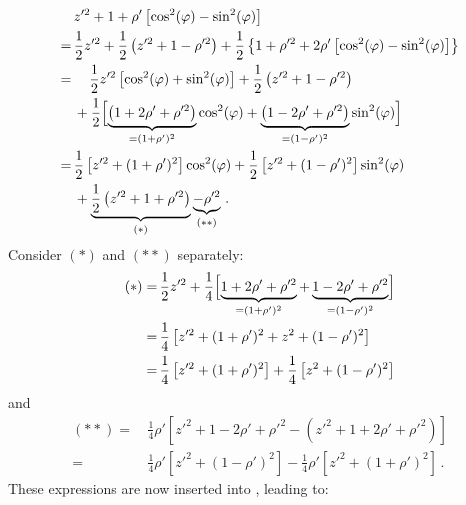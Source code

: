 \begin{align}
 ~&\, z'^2 + 1 + \rho' \left[ \cos^2(\varphi) - \sin^2(\varphi) \right] \nonumber \\
 =&\, \frac{1}{2} z'^2 + \frac{1}{2} \left( z'^2 + 1 - \rho'^2 \right) + \frac{1}{2} \left\{ 1 + \rho'^2 + 2 \rho' \left[ \cos^2(\varphi) - \sin^2(\varphi) \right] \right\} \nonumber \\
 =&\, \phantom{+}~
        \frac{1}{2} z'^2 \left[ \cos^2(\varphi) + \sin^2(\varphi) \right]
      + \frac{1}{2} \left( z'^2 + 1 - \rho'^2 \right) \nonumber \\
 ~&\, + \frac{1}{2} \Bigl[   \underbrace{\left( 1 + 2 \rho' + \rho'^2 \right)}_{=(1+\rho')^2} \cos^2(\varphi)
                           + \underbrace{\left( 1 - 2 \rho' + \rho'^2 \right)}_{=(1-\rho')^2} \sin^2(\varphi) \Bigr] \nonumber \\
 =&\,   \frac{1}{2} \left[ z'^2 + (1 + \rho')^2 \right] \cos^2(\varphi) + \frac{1}{2} \left[ z'^2 + (1 - \rho')^2 \right] \sin^2(\varphi) \nonumber \\
 ~&\, + \underbrace{\frac{1}{2} \left( z'^2 + 1 + \rho'^2 \right)}_{(*)} \underbrace{- \rho'^2}_{(**)} \label{eqn:bZCore} \, .
\end{align}
Consider $(*)$ and $(**)$ separately:
\begin{align}
 (*)
 =&\, \frac{1}{2} z'^2 + \frac{1}{4} \Bigl[ \underbrace{1 + 2 \rho' + \rho'^2}_{=(1+\rho')^2} + \underbrace{1 - 2 \rho' + \rho'^2}_{=(1-\rho')^2} \Bigr] \nonumber \\
 =&\, \frac{1}{4} \left[ z'^2 + (1 + \rho')^2 + z^2 + (1 - \rho')^2 \right] \nonumber \\
 =&\, \frac{1}{4} \left[ z'^2 + (1 + \rho')^2 \right] + \frac{1}{4} \left[ z^2 + (1 - \rho')^2 \right]
\end{align}
and
\begin{align}
  (**)
 =&\, \frac{1}{4} \rho' \left[ z'^2 + 1 - 2 \rho' + \rho'^2 - \left( z'^2 + 1 + 2 \rho' + \rho'^2 \right) \right] \nonumber \\
 =&\, \frac{1}{4} \rho' \left[ z'^2 + ( 1 - \rho')^2 \right] - \frac{1}{4} \rho' \left[ z'^2 + (1 + \rho')^2 \right] \, .
\end{align}
These expressions are now inserted into , leading to:
